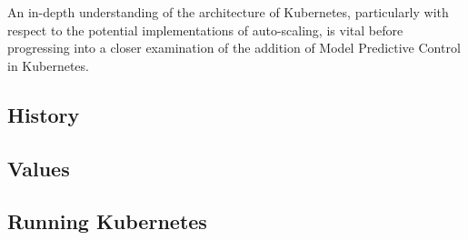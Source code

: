 An in-depth understanding of the architecture of Kubernetes, particularly with
respect to the potential implementations of auto-scaling, is vital before
progressing into a closer examination of the addition of Model Predictive
Control in Kubernetes.

\subsection{History}



\subsection{Values}



\subsection{Running Kubernetes}


